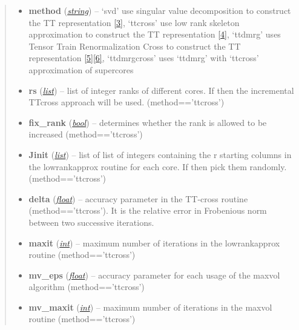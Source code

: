 \documentclass[a4paper,10pt,english]{sphinxmanual}
\begin{document}
\begin{fulllineitems}
\begin{fulllineitems}
\begin{quote}
\begin{description}
\begin{itemize}
\item {} 
\textbf{method} (\href{http://docs.python.org/library/string.html\#module-string}{\emph{string}}) -- `svd' use singular value decomposition to construct the TT representation {\hyperref[zrefs:oseledets2011]{{[}3{]}}}, `ttcross' use low rank skeleton approximation to construct the TT representation {\hyperref[zrefs:oseledets2010]{{[}4{]}}}, `ttdmrg' uses Tensor Train Renormalization Cross to construct the TT representation {\hyperref[zrefs:savostyanov2011]{{[}5{]}}}{\hyperref[zrefs:savostyanov2013]{{[}6{]}}}, `ttdmrgcross' uses `ttdmrg' with `ttcross' approximation of supercores

\item {} 
\textbf{rs} (\href{http://docs.python.org/library/functions.html\#list}{\emph{list}}) -- list of integer ranks of different cores. If  then the incremental TTcross approach will be used. (method=='ttcross')

\item {} 
\textbf{fix\_rank} (\href{http://docs.python.org/library/functions.html\#bool}{\emph{bool}}) -- determines whether the rank is allowed to be increased (method=='ttcross')

\item {} 
\textbf{Jinit} (\href{http://docs.python.org/library/functions.html\#list}{\emph{list}}) -- list of list of integers containing the r starting columns in the lowrankapprox routine for each core. If  then pick them randomly. (method=='ttcross')

\item {} 
\textbf{delta} (\href{http://docs.python.org/library/functions.html\#float}{\emph{float}}) -- accuracy parameter in the TT-cross routine (method=='ttcross'). It is the relative error in Frobenious norm between two successive iterations.

\item {} 
\textbf{maxit} (\href{http://docs.python.org/library/functions.html\#int}{\emph{int}}) -- maximum number of iterations in the lowrankapprox routine (method=='ttcross')

\item {} 
\textbf{mv\_eps} (\href{http://docs.python.org/library/functions.html\#float}{\emph{float}}) -- accuracy parameter for each usage of the maxvol algorithm (method=='ttcross')

\item {} 
\textbf{mv\_maxit} (\href{http://docs.python.org/library/functions.html\#int}{\emph{int}}) -- maximum number of iterations in the maxvol routine (method=='ttcross')


\end{itemize}
\end{description}
\end{quote}
\end{fulllineitems}
\end{fulllineitems}
\end{document}
